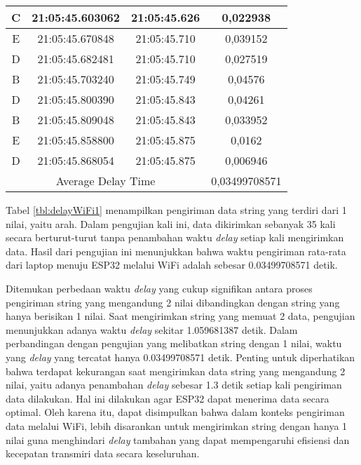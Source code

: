 \begin{table}[!h]
\begin{tabular}{|ccc|c|}
  \multicolumn{1}{|c|}{C}    & \multicolumn{1}{c|}{21:05:45.603062} & 21:05:45.626       & 0,022938      \\ \hline
  \multicolumn{1}{|c|}{E}    & \multicolumn{1}{c|}{21:05:45.670848} & 21:05:45.710       & 0,039152      \\ \hline
  \multicolumn{1}{|c|}{D}    & \multicolumn{1}{c|}{21:05:45.682481} & 21:05:45.710       & 0,027519      \\ \hline
  \multicolumn{1}{|c|}{B}    & \multicolumn{1}{c|}{21:05:45.703240} & 21:05:45.749       & 0,04576       \\ \hline
  \multicolumn{1}{|c|}{D}    & \multicolumn{1}{c|}{21:05:45.800390} & 21:05:45.843       & 0,04261       \\ \hline
  \multicolumn{1}{|c|}{B}    & \multicolumn{1}{c|}{21:05:45.809048} & 21:05:45.843       & 0,033952      \\ \hline
  \multicolumn{1}{|c|}{E}    & \multicolumn{1}{c|}{21:05:45.858800} & 21:05:45.875       & 0,0162        \\ \hline
  \multicolumn{1}{|c|}{D}    & \multicolumn{1}{c|}{21:05:45.868054} & 21:05:45.875       & 0,006946      \\ \hline
  \multicolumn{3}{|c|}{Average Delay Time}                                               & 0,03499708571 \\ \hline
  \end{tabular}
\end{table}

Tabel \ref{tbl:delayWiFi1} menampilkan pengiriman data string yang terdiri dari 1 nilai, yaitu arah. Dalam pengujian kali ini, data dikirimkan sebanyak 35 kali secara berturut-turut tanpa penambahan waktu \emph{delay} setiap kali mengirimkan data. Hasil dari pengujian ini menunjukkan bahwa waktu pengiriman rata-rata dari laptop menuju ESP32 melalui WiFi adalah sebesar 0.03499708571 detik.

Ditemukan perbedaan waktu \emph{delay} yang cukup signifikan antara proses pengiriman string yang mengandung 2 nilai dibandingkan dengan string yang hanya berisikan 1 nilai. Saat mengirimkan string yang memuat 2 data, pengujian menunjukkan adanya waktu \emph{delay} sekitar 1.059681387 detik. Dalam perbandingan dengan pengujian yang melibatkan string dengan 1 nilai, waktu yang \emph{delay} yang tercatat hanya 0.03499708571 detik. Penting untuk diperhatikan bahwa terdapat kekurangan saat mengirimkan data string yang mengandung 2 nilai, yaitu adanya penambahan \emph{delay} sebesar 1.3 detik setiap kali pengiriman data dilakukan. Hal ini dilakukan agar ESP32 dapat menerima data secara optimal. Oleh karena itu, dapat disimpulkan bahwa dalam konteks pengiriman data melalui WiFi, lebih disarankan untuk mengirimkan string dengan hanya 1 nilai guna menghindari \emph{delay} tambahan yang dapat mempengaruhi efisiensi dan kecepatan transmiri data secara keseluruhan.

